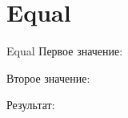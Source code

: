 \section{Equal}
\begin{frame}{Equal}
	Первое значение:


	Второе значение:


	Результат:

\end{frame}
